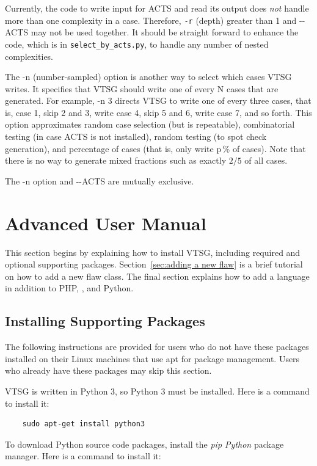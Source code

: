 Currently, the code to write input for ACTS and read its output does \emph{not}
handle more than one complexity in a case.  Therefore, \verb|-r| (depth) greater
than 1 and
-\zws-ACTS may not be used together.  It should be straight forward to enhance
the code, which is in \verb|select_by_acts.py|, to handle any number of
nested complexities.

The -n (number-sampled) option is another way to select which cases VTSG writes.
It specifies that VTSG should write one of every N cases that are generated.
For example, -n 3 directs VTSG to write one of every three cases, that is, case
1, skip 2 and 3, write case
4, skip 5 and 6, write case 7, and so forth.  This option approximates random
case selection (but is repeatable), combinatorial testing (in case ACTS is not
installed), random testing (to spot check generation), and percentage of cases
(that is, only write p\,\% of cases).  Note that there is no way to generate mixed
fractions such as exactly $2/5$ of all cases.

The -n option and -\zws-ACTS are mutually exclusive.


\section{Advanced User Manual}
\label{sec:advanced user manual}

This section begins by explaining how to install VTSG, including required and
optional supporting packages.  Section~\ref{sec:adding a new flaw} is a brief
tutorial on how to add a new flaw class.  The final section explains how to add a
language in addition to PHP, \CSharp, and Python.

\subsection{Installing Supporting Packages}

\noindent The following instructions are provided for users who do not have these
packages installed on their Linux machines that use apt for package management.
Users who already have these
packages may skip this section.

\noindent VTSG is written in Python 3, so Python 3 must be installed.
Here is a command to install it:

\begin{verbatim}
    sudo apt-get install python3
\end{verbatim}

\noindent To download Python source code packages, install the \emph{pip
Python} package manager.
Here is a command to install it:

